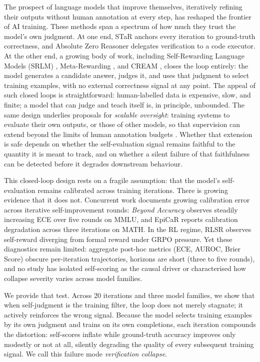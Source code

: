 \documentclass{article}
\begin{document}
The prospect of language models that improve themselves, iteratively
refining their outputs without human annotation at every step, has reshaped
the frontier of AI training.
These methods span a spectrum of how much they trust the model's own judgment.
At one end, STaR \citep{zelikman2022star} anchors every iteration to
ground-truth correctness, and Absolute Zero Reasoner \citep{zhao2025azr}
delegates verification to a code executor.
At the other end, a growing body of work, including Self-Rewarding Language Models
(SRLM) \citep{yuan2024self}, Meta-Rewarding \citep{wu2024metarewarding}, and
CREAM \citep{cream2025}, closes the loop entirely: the model generates a
candidate answer, judges it, and uses that judgment to select training
examples, with no external correctness signal at any point.
The appeal of such closed loops is straightforward: human-labelled data is
expensive, slow, and finite; a model that can judge and teach itself is, in
principle, unbounded.
The same design underlies proposals for \emph{scalable oversight}: training
systems to evaluate their own outputs, or those of other models, so that
supervision can extend beyond the limits of human annotation budgets
\citep{bai2022constitutional}.
Whether that extension is safe depends on whether the self-evaluation signal
remains faithful to the quantity it is meant to track, and on whether a silent
failure of that faithfulness can be detected before it degrades downstream
behaviour.

This closed-loop design rests on a fragile assumption: that the model's
self-evaluation remains calibrated across training iterations.
There is growing evidence that it does not.
Concurrent work documents growing calibration error across iterative
self-improvement rounds: \emph{Beyond Accuracy} \citep{huang2025beyondaccuracy}
observes steadily increasing ECE over five rounds on MMLU, and
EpiCaR \citep{epicar2026} reports calibration degradation across three
iterations on MATH.
In the RL regime, RLSR \citep{rlsr2025} observes self-reward diverging from
formal reward under GRPO pressure.
Yet these diagnostics remain limited: aggregate post-hoc metrics (ECE,
AUROC, Brier Score) obscure per-iteration trajectories, horizons are
short (three to five rounds), and no study has isolated self-scoring as
the causal driver or characterised how collapse severity varies across
model families.

We provide that test.
Across 20 iterations and three model families, we show that when
self-judgment is the training filter, the loop does not merely
stagnate; it actively reinforces the wrong signal.
Because the model selects training examples by its own judgment and trains
on its own completions, each iteration compounds the
distortion: self-scores inflate while ground-truth accuracy improves only
modestly or not at all, silently degrading the quality of every subsequent
training signal.
We call this failure mode \emph{verification collapse}.
\end{document}
